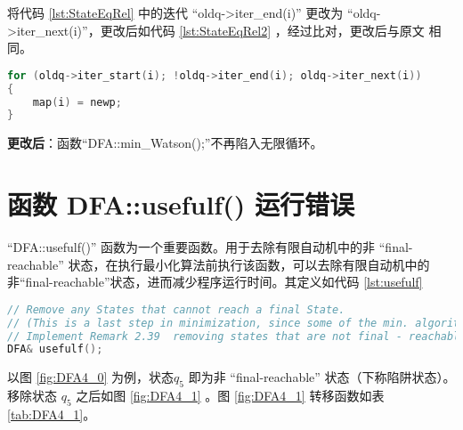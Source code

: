 将代码 \ref{lst:StateEqRel} 中的迭代 “oldq->iter\_end(i)” 更改为 “oldq->iter\_next(i)”，更改后如代码 \ref{lst:StateEqRel2} ，经过比对，更改后与原文 \cite{watson1994design} 相同。
\lstset{style=mystyle}
\begin{lstlisting}[language=C++,label={lst:StateEqRel2},caption={StateEqRel.cpp}]
for (oldq->iter_start(i); !oldq->iter_end(i); oldq->iter_next(i))
{
    map(i) = newp;
}
\end{lstlisting}

{\bfseries 更改后}：函数“DFA::min\_Watson();”不再陷入无限循环。


\section{函数 DFA::usefulf() 运行错误}\label{sec:usefulf}

“DFA::usefulf()” 函数为一个重要函数。用于去除有限自动机中的非 “final-reachable” 状态，在执行最小化算法前执行该函数，可以去除有限自动机中的非“final-reachable”状态，进而减少程序运行时间。其定义如代码 \ref{lst:usefulf}
\lstset{style=mystyle}
\begin{lstlisting}[language=C++,label={lst:usefulf},caption={DFA::usefulf()}]
// Remove any States that cannot reach a final State.
// (This is a last step in minimization, since some of the min. algorithms may yield a DFA with a sink state.)
// Implement Remark 2.39  removing states that are not final - reachable.
DFA& usefulf();
\end{lstlisting}
以图 \ref{fig:DFA4_0} 为例，状态$q_5$ 即为非 “final-reachable” 状态（下称陷阱状态）。移除状态 $q_5$ 之后如图 \ref{fig:DFA4_1} 。图 \ref{fig:DFA4_1} 转移函数如表 \ref{tab:DFA4_1}。

